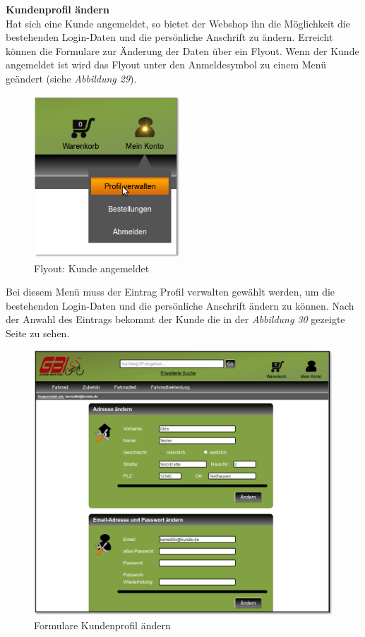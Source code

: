 \textbf{Kundenprofil ändern}\\
Hat sich eine Kunde angemeldet, so bietet der Webshop ihn die Möglichkeit die bestehenden Login-Daten und die persönliche Anschrift zu ändern. Erreicht können die Formulare zur Änderung der Daten über ein Flyout. Wenn der Kunde angemeldet ist wird das Flyout unter den Anmeldesymbol zu einem Menü geändert (siehe \textit{Abbildung 29}).
\begin{figure}[H]
	\begin{center}
			\includegraphics[width=55mm]{Bilder/Abbildung15_Menue_Profil_aendern.png}
	\end{center}
	\caption{Flyout: Kunde angemeldet}
\end{figure}
Bei diesem Menü muss der Eintrag \glqq Profil verwalten\grqq{} gewählt werden, um die bestehenden Login-Daten und die persönliche Anschrift ändern zu können. Nach der Anwahl des Eintrags bekommt der Kunde die in der \textit{Abbildung 30} gezeigte Seite zu sehen.
\begin{figure}[H]
	\begin{center}
			\includegraphics[width=130mm]{Bilder/formulare_profil_aendern.png}
	\end{center}
	\caption{Formulare Kundenprofil ändern}
\end{figure}

